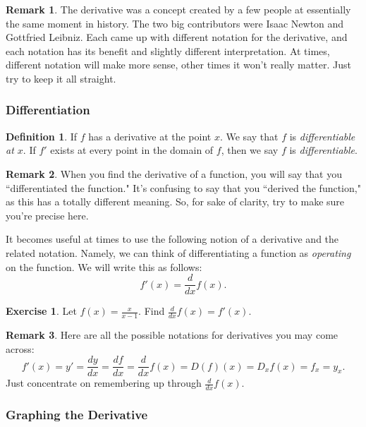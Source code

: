\documentclass[leqno]{article}
\theoremstyle{definition}
\newtheorem{definition}{Definition}[section]
\newtheorem{remark}{Remark}[section]
\newtheorem{exercise}{Exercise}[section]
\theoremstyle{remark}
\theoremstyle{theorem}
\begin{document}
\begin{remark}
The derivative was a concept created by a few people at essentially the same moment in history.  The two big contributors were Isaac Newton and Gottfried Leibniz.  Each came up with different notation for the derivative, and each notation has its benefit and slightly different interpretation.  At times, different notation will make more sense, other times it won't really matter.  Just try to keep it all straight.
\end{remark}

\subsubsection{Differentiation}

\begin{definition}
If $f$ has a derivative at the point $x$.  We say that $f$ is \emph{differentiable at $x$}.  If $f'$ exists at every point in the domain of $f$, then we say $f$ is \emph{differentiable}.
\end{definition}

\begin{remark}
When you find the derivative of a function, you will say that you ``differentiated the function." It's confusing to say that you ``derived the function," as this has a totally different meaning.  So, for sake of clarity, try to make sure you're precise here.
\end{remark}

It becomes useful at times to use the following notion of a derivative and the related notation.  Namely, we can think of differentiating a function as \emph{operating} on the function.  We will write this as follows:
\[
f'(x)=\frac{d}{dx}f(x).
\]

\begin{exercise}
Let $f(x)=\frac{x}{x-1}$. Find $\frac{d}{dx}f(x)=f'(x)$.  
\vspace*{6cm}\\
\end{exercise}

\begin{remark}
Here are all the possible notations for derivatives you may come across:
\[
f'(x)=y'=\frac{dy}{dx}=\frac{df}{dx}=\frac{d}{dx}f(x)=D(f)(x)=D_xf(x)=f_x=y_x.
\]
Just concentrate on remembering up through $\frac{d}{dx}f(x)$.
\end{remark}

\subsubsection{Graphing the Derivative}
\end{document}
